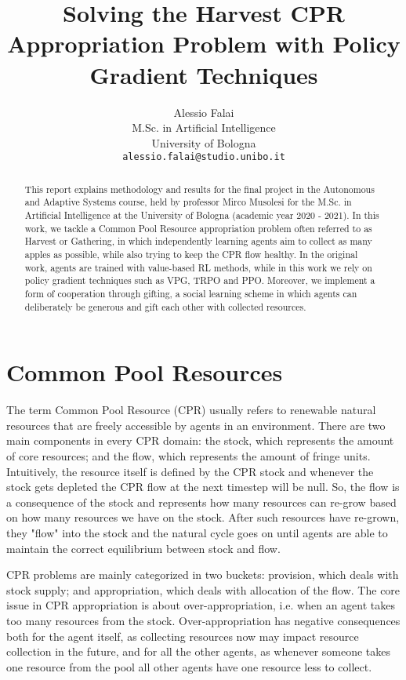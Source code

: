 \documentclass{article}
\title{Solving the Harvest CPR Appropriation Problem with Policy Gradient Techniques}
\author{
  Alessio Falai\\
  M.Sc. in Artificial Intelligence\\
  University of Bologna\\
  \texttt{alessio.falai@studio.unibo.it} \\
}
\begin{document}
\maketitle

\begin{abstract}
  This report explains methodology and results for the final project in the Autonomous and Adaptive Systems course, held by professor Mirco Musolesi for the M.Sc. in Artificial Intelligence at the University of Bologna (academic year 2020 - 2021). In this work, we tackle a Common Pool Resource appropriation problem often referred to as Harvest or Gathering, in which independently learning agents aim to collect as many apples as possible, while also trying to keep the CPR flow healthy. In the original work, agents are trained with value-based RL methods, while in this work we rely on policy gradient techniques such as VPG, TRPO and PPO. Moreover, we implement a form of cooperation through gifting, a social learning scheme in which agents can deliberately be generous and gift each other with collected resources.
\end{abstract}

\section{Common Pool Resources}
The term Common Pool Resource (CPR) usually refers to renewable natural resources that are freely accessible by agents in an environment. There are two main components in every CPR domain: the stock, which represents the amount of core resources; and the flow, which represents the amount of fringe units. Intuitively, the resource itself is defined by the CPR stock and whenever the stock gets depleted the CPR flow at the next timestep will be null. So, the flow is a consequence of the stock and represents how many resources can re-grow based on how many resources we have on the stock. After such resources have re-grown, they "flow" into the stock and the natural cycle goes on until agents are able to maintain the correct equilibrium between stock and flow. 

CPR problems are mainly categorized in two buckets: provision, which deals with stock supply; and appropriation, which deals with allocation of the flow. The core issue in CPR appropriation is about over-appropriation, i.e. when an agent takes too many resources from the stock. Over-appropriation has negative consequences both for the agent itself, as collecting resources now may impact resource collection in the future, and for all the other agents, as whenever someone takes one resource from the pool all other agents have one resource less to collect.
\end{document}
